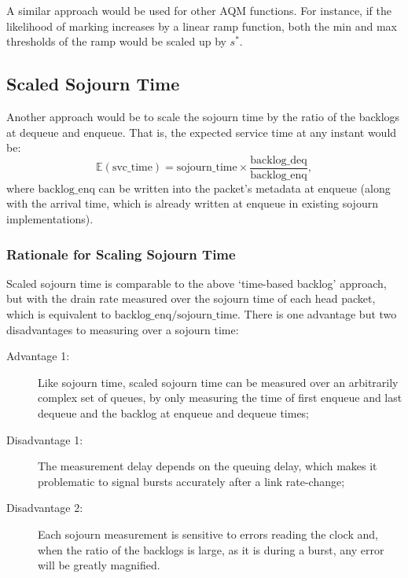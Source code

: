 A similar approach would be used for other AQM functions. For instance, if the likelihood of marking increases by a linear ramp function, both the min and max thresholds of the ramp would be scaled up by \(s^*\).


\subsection{Scaled Sojourn Time}\label{sec:scaled_svc_time}

Another approach would be to scale the sojourn time by the ratio of the backlogs at dequeue and enqueue. That is, the expected service time at any instant would be:
\[\mathbb{E}(\mathrm{svc\_time}) = \mathrm{sojourn\_time} \times \frac{\mathrm{backlog\_deq}}{\mathrm{backlog\_enq}},\]
where \(\mathrm{backlog\_enq}\) can be written into the packet's metadata at enqueue (along with the arrival time, which is already written at enqueue in existing sojourn implementations).

\subsubsection{Rationale for Scaling Sojourn Time}\label{sec:inst_svc_time_justify}

Scaled sojourn time is comparable to the above `time-based backlog' approach, but with the drain rate measured over the sojourn time of each head packet, which is equivalent to \(\mathrm{backlog\_enq}/\mathrm{sojourn\_time}\). There is one advantage but two disadvantages to measuring over a sojourn time:
\begin{description}
	\item[Advantage 1:] Like sojourn time, scaled sojourn time can be measured over an arbitrarily complex set of queues, by only measuring the time of first enqueue and last dequeue and the backlog at enqueue and dequeue times;
	\item[Disadvantage 1:] The measurement delay depends on the queuing delay, which makes it problematic to signal bursts accurately after a link rate-change;
	\item[Disadvantage 2:] Each sojourn measurement is sensitive to errors reading the clock and, when the ratio of the backlogs is large, as it is during a burst, any error will be greatly magnified.
\end{description}

